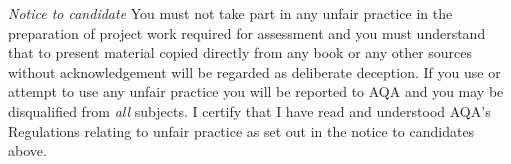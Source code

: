 
\begin{declaration}

\emph{Notice to candidate} You must not take part in any unfair practice in the preparation of project work required for assessment and you must understand that to present material copied directly from any book or any other sources without acknowledgement will be regarded as deliberate deception. If you use or attempt to use any unfair practice you will be reported to AQA and you may be disqualified from \emph{all} subjects.
\newline
\newline
I certify that I have read and understood AQA’s Regulations relating to unfair practice as set out in the notice to candidates above. 
\end{declaration}
